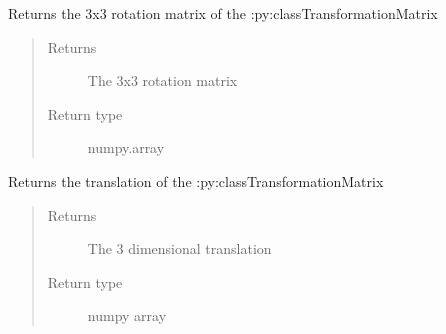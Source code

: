\documentclass[letterpaper,10pt,english]{sphinxmanual}
\begin{document}
\begin{fulllineitems}
\begin{quote}
\begin{description}
\end{description}\end{quote}

\begin{fulllineitems}
\label{\detokenize{code_docu:trip_kinematics.HomogenTransformationMatrix.TransformationMatrix.get_rotation}}
Returns the 3x3 rotation matrix of the :py:class\textasciigrave{}TransformationMatrix\textasciigrave{}
\begin{quote}\begin{description}
\item[{Returns}] \leavevmode
The 3x3 rotation matrix

\item[{Return type}] \leavevmode
numpy.array

\end{description}\end{quote}

\end{fulllineitems}


\begin{fulllineitems}
\label{\detokenize{code_docu:trip_kinematics.HomogenTransformationMatrix.TransformationMatrix.get_translation}}
Returns the translation of the :py:class\textasciigrave{}TransformationMatrix\textasciigrave{}
\begin{quote}\begin{description}
\item[{Returns}] \leavevmode
The 3 dimensional translation

\item[{Return type}] \leavevmode
numpy array

\end{description}\end{quote}

\end{fulllineitems}


\end{fulllineitems}
\end{document}
